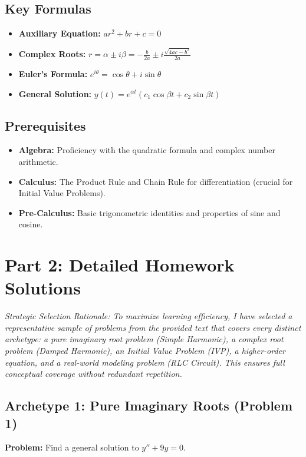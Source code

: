 \documentclass[11pt]{article}
\begin{document}
\subsection{Key Formulas}
\begin{itemize}
    \item \textbf{Auxiliary Equation:} $ar^2 + br + c = 0$
    \item \textbf{Complex Roots:} $r = \alpha \pm i\beta = -\frac{b}{2a} \pm i\frac{\sqrt{4ac - b^2}}{2a}$
    \item \textbf{Euler's Formula:} $e^{i\theta} = \cos\theta + i\sin\theta$
    \item \textbf{General Solution:} $y(t) = e^{\alpha t}(c_1 \cos \beta t + c_2 \sin \beta t)$
\end{itemize}

\subsection{Prerequisites}
\begin{itemize}
    \item \textbf{Algebra:} Proficiency with the quadratic formula and complex number arithmetic.
    \item \textbf{Calculus:} The Product Rule and Chain Rule for differentiation (crucial for Initial Value Problems).
    \item \textbf{Pre-Calculus:} Basic trigonometric identities and properties of sine and cosine.
\end{itemize}

\newpage
\section{Part 2: Detailed Homework Solutions}
\textit{Strategic Selection Rationale: To maximize learning efficiency, I have selected a representative sample of problems from the provided text that covers every distinct archetype: a pure imaginary root problem (Simple Harmonic), a complex root problem (Damped Harmonic), an Initial Value Problem (IVP), a higher-order equation, and a real-world modeling problem (RLC Circuit). This ensures full conceptual coverage without redundant repetition.}

\subsection{Archetype 1: Pure Imaginary Roots (Problem 1)}
\textbf{Problem:} Find a general solution to $y'' + 9y = 0$.
\end{document}
